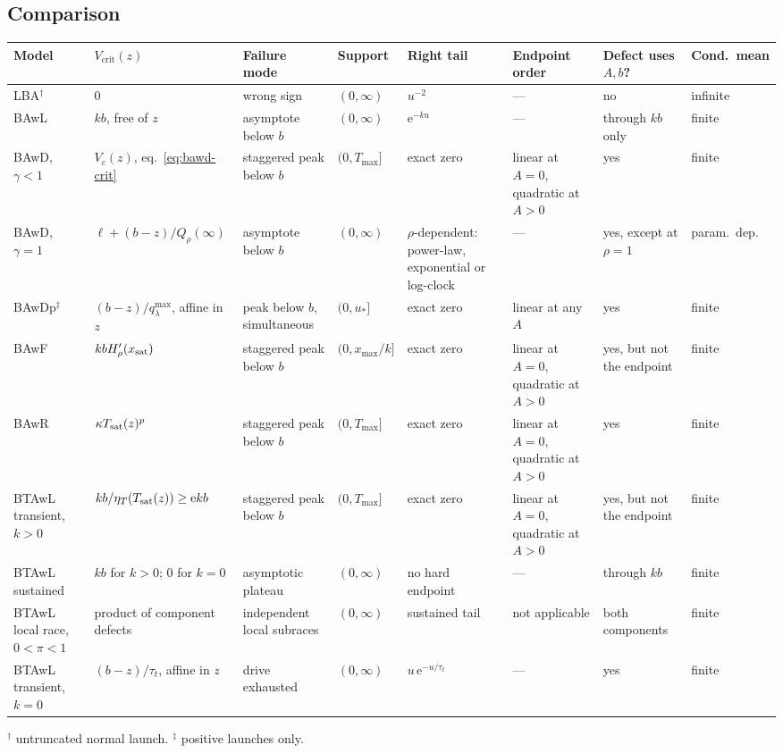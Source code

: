 \documentclass[12pt]{article}
\newcommand{\e}{\mathrm{e}}
\theoremstyle{remark}
\begin{document}
\subsection{Comparison}
\begin{center}
\small
\begin{tabular}{L{0.075\textwidth}L{0.125\textwidth}L{0.09\textwidth}L{0.095\textwidth}L{0.10\textwidth}L{0.10\textwidth}L{0.085\textwidth}L{0.06\textwidth}}
\toprule
Model & $V_{\mathrm{crit}}(z)$ & Failure mode & Support & Right tail &
Endpoint order & Defect uses $A,b$? & Cond.\ mean \\
\midrule
LBA$^{\dagger}$ & $0$ & wrong sign & $(0,\infty)$ & $u^{-2}$ & --- &
no & infinite \\
\addlinespace
BAwL & $kb$, free of $z$ & asymptote below $b$ & $(0,\infty)$ &
$\e^{-ku}$ & --- & through $kb$ only & finite \\
\addlinespace
BAwD, $\gamma<1$ & $V_c(z)$, eq.~\eqref{eq:bawd-crit} & staggered peak below
$b$ & $(0,T_{\max}]$ & exact zero & linear at $A=0$, quadratic at $A>0$ &
yes & finite \\
\addlinespace
BAwD, $\gamma=1$ & $\ell+(b-z)/Q_\rho(\infty)$ & asymptote below $b$ &
$(0,\infty)$ & $\rho$-dependent: power-law, exponential or log-clock & --- &
yes, except at $\rho=1$ & param.\ dep. \\
\addlinespace
BAwDp$^{\ddagger}$ & $(b-z)/q_\lambda^{\max}$, affine in $z$ &
peak below $b$, simultaneous & $(0,u_{*}]$ & exact zero & linear at any $A$ &
yes & finite \\
\addlinespace
BAwF & $kbH_\rho'(x_{\rm sat})$ & staggered peak below $b$ &
$(0,x_{\max}/k]$ & exact zero & linear at $A=0$, quadratic at $A>0$ &
yes, but not the endpoint & finite \\
\addlinespace
BAwR & $\kappa T_{\rm sat}(z)^{p}$ & staggered peak below $b$ &
$(0,T_{\max}]$ & exact zero & linear at $A=0$, quadratic at $A>0$ &
yes & finite \\
\addlinespace
BTAwL transient, $k>0$ & $kb/\eta_T(T_{\rm sat}(z))\ge\e kb$ &
staggered peak below $b$ & $(0,T_{\max}]$ & exact zero &
linear at $A=0$, quadratic at $A>0$ & yes, but not the endpoint & finite \\
\addlinespace
BTAwL sustained & $kb$ for $k>0$; $0$ for $k=0$ & asymptotic plateau &
$(0,\infty)$ & no hard endpoint & --- & through $kb$ & finite \\
\addlinespace
BTAwL local race, $0<\pi<1$ & product of component defects &
independent local subraces & $(0,\infty)$ & sustained tail &
not applicable & both components & finite \\
\addlinespace
BTAwL transient, $k=0$ & $(b-z)/\tau_t$, affine in $z$ & drive exhausted &
$(0,\infty)$ & $u\,\e^{-u/\tau_t}$ & --- & yes & finite \\
\bottomrule
\end{tabular}

\smallskip
{\footnotesize $^{\dagger}$ untruncated normal launch. \quad
$^{\ddagger}$ positive launches only.}
\end{center}
\end{document}
